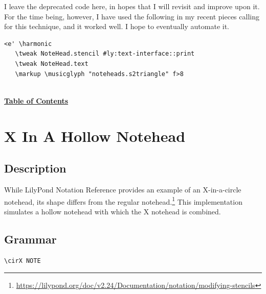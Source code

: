 I leave the deprecated code here, in hopes that I will revisit and improve upon it. For the time being, however, I have used the following in my recent pieces calling for this technique, and it worked well. I hope to eventually automate it.

\begin{Verbatim}
<e' \harmonic
   \tweak NoteHead.stencil #ly:text-interface::print
   \tweak NoteHead.text
   \markup \musicglyph "noteheads.s2triangle" f>8
   
\end{Verbatim}

\hyperref[sec:toc]{\textbf{Table of Contents}}
\clearpage



\section {X In A Hollow Notehead}
\hfill

\subsection{Description}
While LilyPond Notation Reference provides an example of an X-in-a-circle notehead, its shape differs from the regular notehead.\footnote{\url{https://lilypond.org/doc/v2.24/Documentation/notation/modifying-stencils}} This implementation simulates a hollow notehead with which the X notehead is combined.

\subsection{Grammar}
\begin{verbatim}
\cirX NOTE
\end{verbatim}
